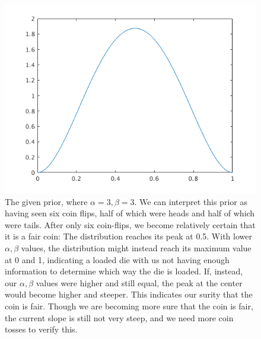 \documentclass{article}
\begin{document}
\begin{figure}[!ht]
	\centering
	\includegraphics[width=120mm]{q2-prior.png}
	\caption{The given prior, where $\alpha = 3, \beta = 3$. We can interpret 
        this prior as having seen six coin flips, half of which were heads and 
        half of which were tails. After only six coin-flips, we become 
        relatively certain that it is a fair coin: The distribution reaches its 
        peak at 0.5. With lower $\alpha, \beta$ values, the distribution might 
        instead reach its maximum value at 0 and 1, indicating a loaded die 
        with us not having enough information to determine which way the die is 
        loaded. If, instead, our $\alpha, \beta$ values were higher and still 
        equal, the peak at the center would become higher and steeper. This 
        indicates our surity that the coin is fair. Though 
        we are becoming more sure that the coin is fair, the current slope is 
        still not very steep, and we need more coin tosses to verify this. }
\end{figure}
\end{document}
